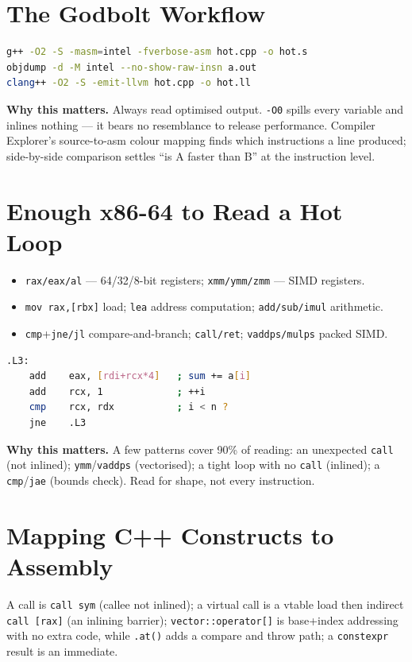 \section{The Godbolt Workflow}
\begin{lstlisting}[language=bash, caption={Emitting assembly locally; always read -O2, not -O0.}]
g++ -O2 -S -masm=intel -fverbose-asm hot.cpp -o hot.s
objdump -d -M intel --no-show-raw-insn a.out
clang++ -O2 -S -emit-llvm hot.cpp -o hot.ll
\end{lstlisting}

\textbf{Why this matters.} Always read optimised output. \texttt{-O0} spills every variable and inlines nothing --- it bears no resemblance to release performance. Compiler Explorer's source-to-asm colour mapping finds which instructions a line produced; side-by-side comparison settles ``is A faster than B'' at the instruction level.

\section{Enough x86-64 to Read a Hot Loop}
\begin{itemize}
\item \texttt{rax/eax/al} --- 64/32/8-bit registers; \texttt{xmm/ymm/zmm} --- SIMD registers.
\item \texttt{mov rax,[rbx]} load; \texttt{lea} address computation; \texttt{add/sub/imul} arithmetic.
\item \texttt{cmp}+\texttt{jne/jl} compare-and-branch; \texttt{call/ret}; \texttt{vaddps/mulps} packed SIMD.
\end{itemize}

\begin{lstlisting}[language=bash, caption={A scalar reduction loop at -O2 (Intel syntax).}]
.L3:
    add    eax, [rdi+rcx*4]   ; sum += a[i]
    add    rcx, 1             ; ++i
    cmp    rcx, rdx           ; i < n ?
    jne    .L3
\end{lstlisting}

\textbf{Why this matters.} A few patterns cover 90\% of reading: an unexpected \texttt{call} (not inlined); \texttt{ymm}/\texttt{vaddps} (vectorised); a tight loop with no \texttt{call} (inlined); a \texttt{cmp}/\texttt{jae} (bounds check). Read for shape, not every instruction.

\section{Mapping C++ Constructs to Assembly}
A call is \texttt{call sym} (callee not inlined); a virtual call is a vtable load then indirect \texttt{call [rax]} (an inlining barrier); \texttt{vector::operator[]} is base+index addressing with no extra code, while \texttt{.at()} adds a compare and throw path; a \texttt{constexpr} result is an immediate.

